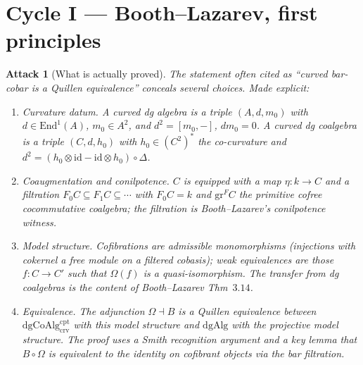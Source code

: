 \documentclass[11pt]{amsart}
\newtheorem{attack}{Attack}
\newcommand{\crv}{\mathrm{crv}}
\newcommand{\cpt}{\mathrm{cpt}}
\newcommand{\dgAlg}{\mathrm{dgAlg}}
\newcommand{\dgCoAlg}{\mathrm{dgCoAlg}}
\begin{document}
\section{Cycle I --- Booth--Lazarev, first principles}
\label{sec:cycle-I}

\begin{attack}[What is actually proved]
The statement often cited as ``curved bar-cobar is a Quillen
equivalence'' conceals several choices. Made explicit:
\begin{enumerate}[label=(\alph*)]
\item \emph{Curvature datum.} A curved dg algebra is a triple
$(A,d,m_0)$ with $d\in\mathrm{End}^1(A)$, $m_0\in A^2$, and
$d^2=[m_0,-]$, $d m_0=0$. A curved dg coalgebra is a triple
$(C,d,h_0)$ with $h_0\in(C^2)^*$ the co-curvature and
$d^2=(h_0\otimes\mathrm{id}-\mathrm{id}\otimes h_0)\circ\Delta$.
\item \emph{Coaugmentation and conilpotence.} $C$ is equipped with a
map $\eta:k\to C$ and a filtration
$F_0 C\subseteq F_1 C\subseteq\cdots$ with $F_0 C=k$ and
$\mathrm{gr}^F C$ the primitive cofree cocommutative coalgebra; the
filtration is Booth--Lazarev's conilpotence witness.
\item \emph{Model structure.} Cofibrations are admissible monomorphisms
(injections with cokernel a free module on a filtered cobasis);
weak equivalences are those $f:C\to C'$ such that $\Omega(f)$ is a
quasi-isomorphism. The transfer from dg coalgebras is the content
of Booth--Lazarev Thm~$3.14$.
\item \emph{Equivalence.} The adjunction $\Omega\dashv B$ is a Quillen
equivalence between
$\dgCoAlg^{\cpt}_{\crv}$ with this model structure and $\dgAlg$ with
the projective model structure. The proof uses a Smith recognition
argument and a key lemma that $B\circ\Omega$ is equivalent to the
identity on cofibrant objects via the bar filtration.
\end{enumerate}
\end{attack}
\end{document}
